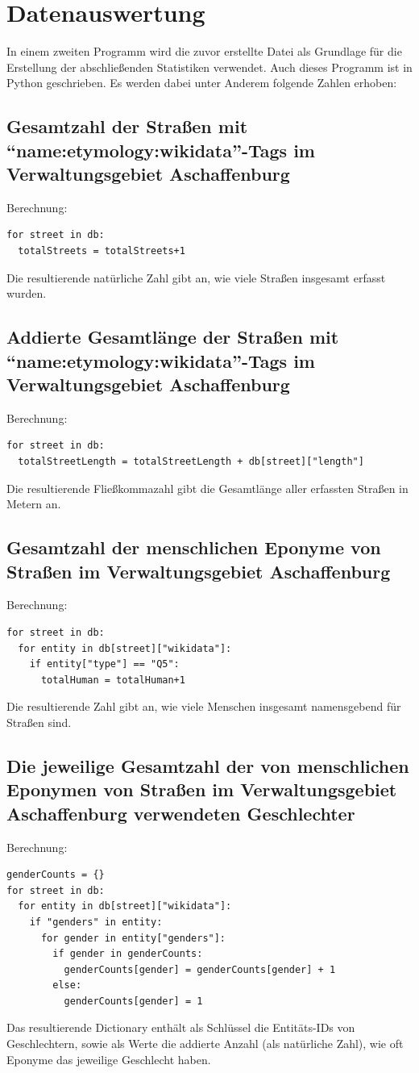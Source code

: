 \documentclass[ngerman,twocolumn,showpacs,%
  nofootinbib,aps,superscriptaddress,%
  eqsecnum,prd,notitlepage,showkeys,10pt,report]{revtex4-2}
\begin{document}
\section{Datenauswertung}
In einem zweiten Programm wird die zuvor erstellte Datei als Grundlage für die Erstellung
der abschließenden Statistiken verwendet. Auch dieses Programm ist in Python
geschrieben.
Es werden dabei unter Anderem folgende Zahlen erhoben:

\subsection{Gesamtzahl der Straßen mit “name:etymology:wikidata”-Tags im
Verwaltungsgebiet Aschaffenburg}
Berechnung:
\begin{lstlisting}
for street in db:
  totalStreets = totalStreets+1
\end{lstlisting}
Die resultierende natürliche Zahl gibt an, wie viele Straßen insgesamt erfasst wurden.

\subsection{Addierte Gesamtlänge der Straßen mit “name:etymology:wikidata”-Tags
im Verwaltungsgebiet Aschaffenburg}
Berechnung:
\begin{lstlisting}
for street in db:
  totalStreetLength = totalStreetLength + db[street]["length"]
\end{lstlisting}
Die resultierende Fließkommazahl gibt die Gesamtlänge aller erfassten Straßen in Metern
an.

\subsection{Gesamtzahl der menschlichen Eponyme von Straßen im
Verwaltungsgebiet Aschaffenburg}
Berechnung:
\begin{lstlisting}
for street in db:
  for entity in db[street]["wikidata"]:
    if entity["type"] == "Q5":
      totalHuman = totalHuman+1
\end{lstlisting}
Die resultierende Zahl gibt an, wie viele Menschen insgesamt namensgebend für Straßen
sind.

\subsection{Die jeweilige Gesamtzahl der von menschlichen Eponymen von Straßen
im Verwaltungsgebiet Aschaffenburg verwendeten Geschlechter}
Berechnung:
\begin{lstlisting}
genderCounts = {}
for street in db:
  for entity in db[street]["wikidata"]:
    if "genders" in entity:
      for gender in entity["genders"]:
        if gender in genderCounts:
          genderCounts[gender] = genderCounts[gender] + 1
        else:
          genderCounts[gender] = 1
\end{lstlisting}
Das resultierende Dictionary enthält als Schlüssel die Entitäts-IDs von Geschlechtern, sowie
als Werte die addierte Anzahl (als natürliche Zahl), wie oft Eponyme das jeweilige
Geschlecht haben.
\end{document}
